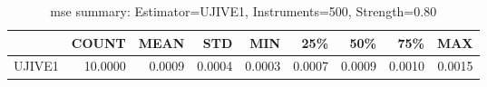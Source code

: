 \begin{table}[ht]
\centering
\caption{mse summary: Estimator=UJIVE1, Instruments=500, Strength=0.80}
\begin{tabular}{lrrrrrrrr}
\toprule
 & COUNT & MEAN & STD & MIN & 25\% & 50\% & 75\% & MAX \\
\midrule
UJIVE1 & 10.0000 & 0.0009 & 0.0004 & 0.0003 & 0.0007 & 0.0009 & 0.0010 & 0.0015 \\
\bottomrule
\end{tabular}
\end{table}
